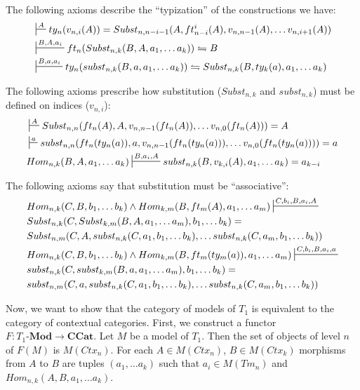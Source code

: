 \documentclass{amsart}
\theoremstyle{definition}
\theoremstyle{remark}
\newcommand{\cat}[1]{\mathbf{#1}}
\newcommand{\ccat}{\cat{CCat}}
\newcommand{\Mod}{\text{-}\cat{Mod}}
\numberwithin{figure}{section}
\begin{document}
The following axioms describe the ``typization'' of the constructions we have:
\begin{align}
\label{ax:type-var}
& \sststile{}{A}         ty_n(v_{n,i}(A)) = Subst_{n,n-i-1}(A, ft^i_{n-i}(A), v_{n,n-1}(A), \ldots v_{n,i+1}(A)) \\
\label{ax:type-Subst}
& \sststile{}{B, A, a_i} ft_n(Subst_{n,k}(B, A, a_1, \ldots a_k)) \leftrightharpoons B \\
\label{ax:type-subst}
& \sststile{}{B, a, a_i} ty_n(subst_{n,k}(B, a, a_1, \ldots a_k)) \leftrightharpoons Subst_{n,k}(B, ty_k(a), a_1, \ldots a_k)
\end{align}

The following axioms prescribe how substitution ($Subst_{n,k}$ and $subst_{n,k}$) must be defined on indices ($v_{n,i}$):
\begin{align}
\label{ax:Subst-var}
& \sststile{}{A}         Subst_{n,n}(ft_n(A), A, v_{n,n-1}(ft_n(A)), \ldots v_{n,0}(ft_n(A))) = A \\
\label{ax:subst-var}
& \sststile{}{a}         subst_{n,n}(ft_n(ty_n(a)), a, v_{n,n-1}(ft_n(ty_n(a))), \ldots v_{n,0}(ft_n(ty_n(a)))) = a \\
\label{ax:var-subst}
& Hom_{n,k}(B, A, a_1, \ldots a_k) \sststile{}{B, a_i, A} subst_{n,k}(B, v_{k,i}(A), a_1, \ldots a_k) = a_{k-i}
\end{align}

The following axioms say that substitution must be ``associative'':
\begin{align}
\label{ax:Subst-Subst}
& Hom_{n,k}(C, B, b_1, \ldots b_k) \land Hom_{k,m}(B, ft_m(A), a_1, \ldots a_m) \sststile{}{C, b_i, B, a_i, A} \\ \notag
& Subst_{n,k}(C, Subst_{k,m}(B, A, a_1, \ldots a_m), b_1, \ldots b_k) = \\ \notag
& Subst_{n,m}(C, A, subst_{n,k}(C, a_1, b_1, \ldots b_k), \ldots subst_{n,k}(C, a_m, b_1, \ldots b_k)) \\
\label{ax:subst-subst}
& Hom_{n,k}(C, B, b_1, \ldots b_k) \land Hom_{k,m}(B, ft_m(ty_m(a)), a_1, \ldots a_m) \sststile{}{C, b_i, B, a_i, a} \\ \notag
& subst_{n,k}(C, subst_{k,m}(B, a, a_1, \ldots a_m), b_1, \ldots b_k) = \\ \notag
& subst_{n,m}(C, a, subst_{n,k}(C, a_1, b_1, \ldots b_k), \ldots subst_{n,k}(C, a_m, b_1, \ldots b_k))
\end{align}

Now, we want to show that the category of models of $T_1$ is equivalent to the category of contextual categories.
First, we construct a functor $F : T_1\Mod \to \ccat$.
Let $M$ be a model of $T_1$.
Then the set of objects of level $n$ of $F(M)$ is $M(Ctx_n)$.
For each $A \in M(Ctx_n)$, $B \in M(Ctx_k)$ morphisms from $A$ to $B$ are tuples $(a_1, \ldots a_k)$ such that $a_i \in M(Tm_n)$ and $Hom_{n,k}(A, B, a_1, \ldots a_k)$.
\end{document}
